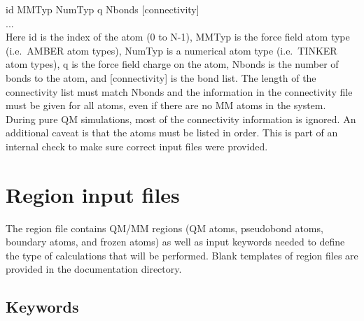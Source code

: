 \documentclass[12pt]{report}
\begin{document}
id MMTyp NumTyp q Nbonds [connectivity] \\
... \\

Here id is the index of the atom (0 to N-1), MMTyp is the force field atom
type (i.e.\ AMBER atom types), NumTyp is a numerical atom type (i.e.\ TINKER
atom types), q is the force field charge on the atom, Nbonds is the number of
bonds to the atom, and [connectivity] is the bond list.
The length of the connectivity list must match Nbonds and the information in
the connectivity file must be given for all atoms, even if there are no MM
atoms in the system.
During pure QM simulations, most of the connectivity information is ignored.
An additional caveat is that the atoms must be listed in order.
This is part of an internal check to make sure correct input files were
provided.
\newpage
\section{Region input files}

The region file contains QM/MM regions (QM atoms, pseudobond atoms, boundary
atoms, and frozen atoms) as well as input keywords needed to define the
type of calculations that will be performed.
Blank templates of region files are provided in the documentation
directory. \\

\subsection{Keywords}
\end{document}
